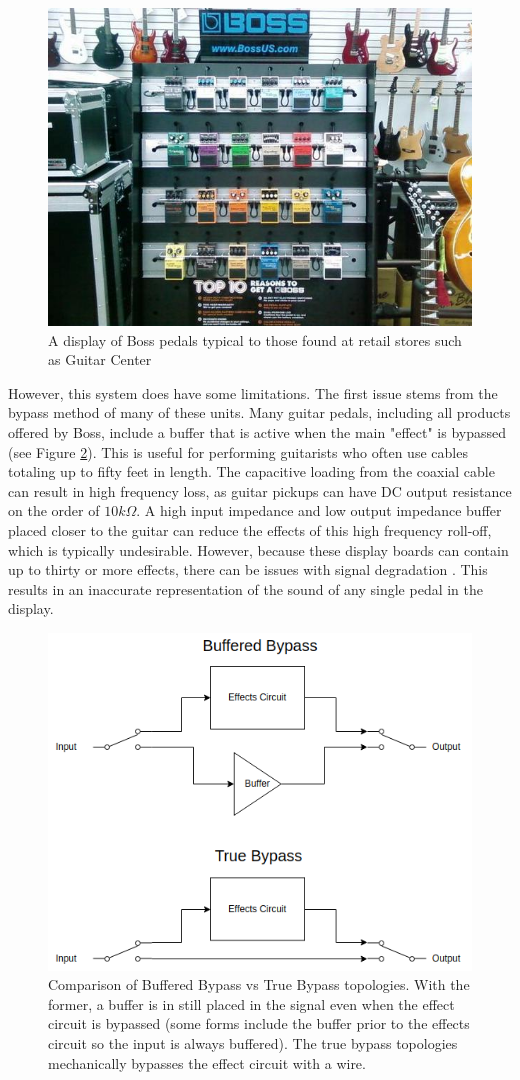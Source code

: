 \documentclass{article}
\begin{document}
	\begin{figure}
		\centering
		\includegraphics[width = 0.6 \textwidth]{BossDisplay.jpg}
		\caption{A display of Boss pedals typical to those found at retail stores such as Guitar Center \cite{BossDisplayPhoto}}
		\label{fig:BossDisplay}
	\end{figure}

	However, this system does have some limitations.  The first issue stems from the bypass method of many of these units.  Many guitar pedals, including all products offered by Boss, include a buffer that is active when the main "effect" is bypassed (see Figure \ref{fig:BufferedBypassConfig}).  This is useful for performing guitarists who often use cables totaling up to fifty feet in length.  The capacitive loading from the coaxial cable can result in high frequency loss, as guitar pickups can have DC output resistance on the order of $10k\Omega$.  A high input impedance and low output impedance buffer placed closer to the guitar can reduce the effects of this high frequency roll-off, which is typically undesirable.  However, because these display boards can contain up to thirty or more effects, there can be issues with signal degradation \cite{OrmanBypassMeasurements}.  This results in an inaccurate representation of the sound of any single pedal in the display.

	\begin{figure}
		\centering
		\includegraphics[width = 0.6 \textwidth]{BufferedvTrueBypass}
		\caption{Comparison of Buffered Bypass vs True Bypass topologies.  With the former, a buffer is in still placed in the signal even when the effect circuit is bypassed (some forms include the buffer prior to the effects circuit so the input is always buffered).  The true bypass topologies mechanically bypasses the effect circuit with a wire.}
		\label{fig:BufferedBypassConfig}
	\end{figure}
\end{document}
